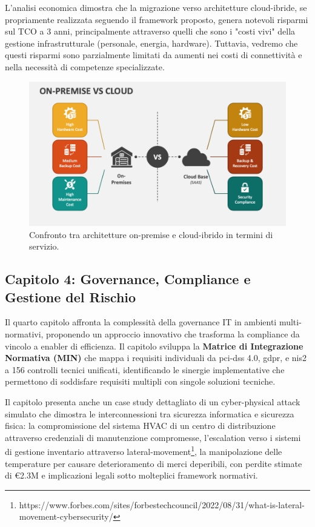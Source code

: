 L'analisi economica dimostra che la migrazione verso architetture cloud-ibride, se propriamente realizzata seguendo il framework proposto, genera notevoli risparmi sul TCO a 3 anni, principalmente attraverso quelli che sono i "costi vivi" della gestione infrastrutturale (personale, energia, hardware). Tuttavia, vedremo che questi risparmi sono parzialmente limitati da aumenti nei costi di connettività e nella necessità di competenze specializzate.
\begin{figure}[H]
    \centering
    \includegraphics[width=\textwidth]{thesis_figures/cap1/on-premise-vs-cloud.png}
    \caption{Confronto tra architetture on-premise e cloud-ibrido in termini di servizio.}
    \label{fig:on-premise-vs-cloud}
\end{figure}

\subsection{Capitolo 4: Governance, Compliance e Gestione del Rischio}

\label{ssec:struttura_cap4}
Il quarto capitolo affronta la complessità della governance IT in ambienti multi-normativi, proponendo un approccio innovativo che trasforma la compliance da vincolo a enabler di efficienza. Il capitolo sviluppa la \textbf{Matrice di Integrazione Normativa (MIN)} che mappa i requisiti individuali da \gls{pci-dss} 4.0, \gls{gdpr}, e \gls{nis2} a 156 controlli tecnici unificati, identificando le sinergie implementative che permettono di soddisfare requisiti multipli con singole soluzioni tecniche.

Il capitolo presenta anche un case study dettagliato di un cyber-physical attack simulato che dimostra le interconnessioni tra sicurezza informatica e sicurezza fisica: la compromissione del sistema HVAC di un centro di distribuzione attraverso credenziali di manutenzione compromesse, l'escalation verso i sistemi di gestione inventario attraverso \gls{lateral-movement}\footnote{https://www.forbes.com/sites/forbestechcouncil/2022/08/31/what-is-lateral-movement-cybersecurity/}, la manipolazione delle temperature per causare deterioramento di merci deperibili, con perdite stimate di €2.3M e implicazioni legali sotto molteplici framework normativi.

